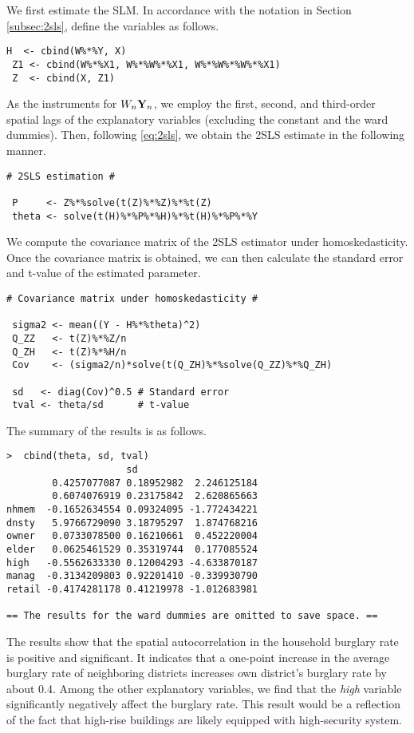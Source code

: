 \documentclass[11pt, A4paper, openany, uplatex]{book}
\begin{document}
We first estimate the SLM.
In accordance with the notation in Section \ref{subsec:2sls}, define the variables as follows.
\begin{lstlisting}[basicstyle=\ttfamily\footnotesize, frame=single]
 H  <- cbind(W%*%Y, X)
 Z1 <- cbind(W%*%X1, W%*%W%*%X1, W%*%W%*%W%*%X1)
 Z  <- cbind(X, Z1)
\end{lstlisting}
As the instruments for $W_n \mathbf{Y}_n$, we employ the first, second, and third-order spatial lags of the explanatory variables (excluding the constant and the ward dummies).
Then, following \eqref{eq:2sls}, we obtain the 2SLS estimate in the following manner.
\begin{lstlisting}[basicstyle=\ttfamily\footnotesize, frame=single]
# 2SLS estimation #

 P     <- Z%*%solve(t(Z)%*%Z)%*%t(Z)
 theta <- solve(t(H)%*%P%*%H)%*%t(H)%*%P%*%Y
\end{lstlisting}
We compute the covariance matrix of the 2SLS estimator under homoskedasticity.
Once the covariance matrix is obtained, we can then calculate the standard error and t-value of the estimated parameter.
\begin{lstlisting}[basicstyle=\ttfamily\footnotesize, frame=single]
# Covariance matrix under homoskedasticity #

 sigma2 <- mean((Y - H%*%theta)^2) 
 Q_ZZ   <- t(Z)%*%Z/n
 Q_ZH   <- t(Z)%*%H/n 
 Cov    <- (sigma2/n)*solve(t(Q_ZH)%*%solve(Q_ZZ)%*%Q_ZH)

 sd   <- diag(Cov)^0.5 # Standard error
 tval <- theta/sd      # t-value
\end{lstlisting}
The summary of the results is as follows. 
\begin{lstlisting}[basicstyle=\ttfamily\footnotesize, frame=single]
>  cbind(theta, sd, tval)
                     sd
        0.4257077087 0.18952982  2.246125184
        0.6074076919 0.23175842  2.620865663
nhmem  -0.1652634554 0.09324095 -1.772434221
dnsty   5.9766729090 3.18795297  1.874768216
owner   0.0733078500 0.16210661  0.452220004
elder   0.0625461529 0.35319744  0.177085524
high   -0.5562633330 0.12004293 -4.633870187
manag  -0.3134209803 0.92201410 -0.339930790
retail -0.4174281178 0.41219978 -1.012683981

== The results for the ward dummies are omitted to save space. ==
\end{lstlisting}
The results show that the spatial autocorrelation in the household burglary rate is positive and significant.
It indicates that a one-point increase in the average burglary rate of neighboring districts increases own district's burglary rate by about 0.4.
Among the other explanatory variables, we find that the \textit{high} variable significantly negatively affect the burglary rate.
This result would be a reflection of the fact that high-rise buildings are likely equipped with high-security system.
\bigskip
\end{document}
